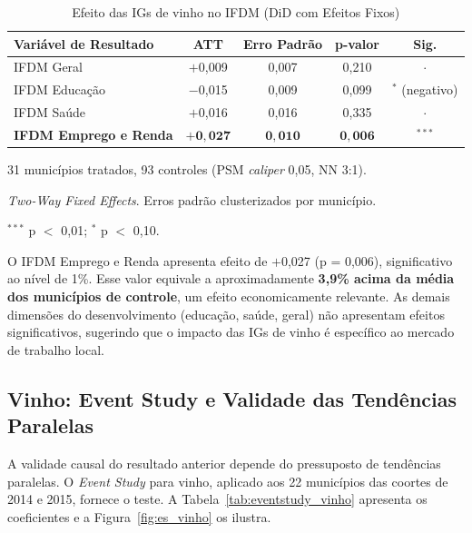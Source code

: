 \documentclass[12pt, a4paper]{article}
\begin{document}
\begin{table}[htbp]
\centering
\caption{Efeito das IGs de vinho no IFDM (DiD com Efeitos Fixos)}
\label{tab:did_vinho}
\begin{threeparttable}
\begin{tabular}{lcccc}
\toprule
Variável de Resultado & ATT & Erro Padrão & p-valor & Sig. \\
\midrule
IFDM Geral                    & $+$0,009 & 0,007 & 0,210 & $\cdot$ \\
IFDM Educação                 & $-$0,015 & 0,009 & 0,099 & $^{*}$ (negativo) \\
IFDM Saúde                    & $+$0,016 & 0,016 & 0,335 & $\cdot$ \\
\textbf{IFDM Emprego e Renda} & $\mathbf{+0{,}027}$ & $\mathbf{0{,}010}$ & $\mathbf{0{,}006}$ & $^{***}$ \\
\bottomrule
\end{tabular}
\begin{tablenotes}
\small
\item 31 municípios tratados, 93 controles (PSM \textit{caliper} 0,05, NN 3:1).
\item \textit{Two-Way Fixed Effects}. Erros padrão clusterizados por município.
\item $^{***}$ p $<$ 0,01;\; $^{*}$ p $<$ 0,10.
\end{tablenotes}
\end{threeparttable}
\end{table}

O IFDM Emprego e Renda apresenta efeito de $+$0,027 (p = 0,006), significativo ao nível de 1\%. Esse valor equivale a aproximadamente \textbf{3,9\% acima da média dos municípios de controle}, um efeito economicamente relevante. As demais dimensões do desenvolvimento (educação, saúde, geral) não apresentam efeitos significativos, sugerindo que o impacto das IGs de vinho é específico ao mercado de trabalho local.

\subsection{Vinho: Event Study e Validade das Tendências Paralelas}

A validade causal do resultado anterior depende do pressuposto de tendências paralelas. O \textit{Event Study} para vinho, aplicado aos 22 municípios das coortes de 2014 e 2015, fornece o teste. A Tabela~\ref{tab:eventstudy_vinho} apresenta os coeficientes e a Figura~\ref{fig:es_vinho} os ilustra.
\end{document}
